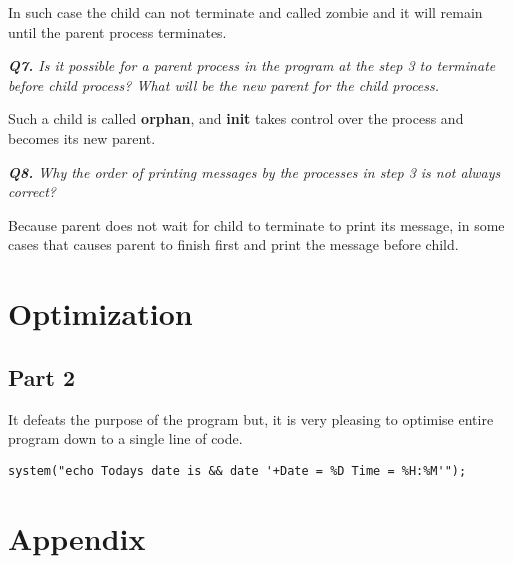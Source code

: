 \documentclass[11pt]{article}
\begin{document}
In such case the child can not terminate and called zombie and it will remain until the parent process terminates.

\vspace{5mm}
\textit{\textbf{Q7.} Is it possible for a parent process in the program at the step 3 to terminate before child process? What will be the new parent for the child process.}
\vspace{5mm}

Such a child is called \textbf{orphan}, and \textbf{init} takes control over the process and becomes its new parent.

\vspace{5mm}
\textit{\textbf{Q8.} Why the order of printing messages by the processes in step 3 is not always correct?}
\vspace{5mm}

Because parent does not wait for child to terminate to print its message, in some cases that causes parent to finish first and print the message before child.

\section*{Optimization}

\subsection*{Part 2}

It defeats the purpose of the program but, it is very pleasing to optimise entire program down to a single line of code.

\vspace{2mm}
\begin{minipage}{1\textwidth}
\begin{lstlisting}[frame=tlrb]
system("echo Todays date is && date '+Date = %D Time = %H:%M'");
\end{lstlisting}
\end{minipage}

\newpage

\section*{Appendix}

\thispagestyle{empty}
\end{document}
